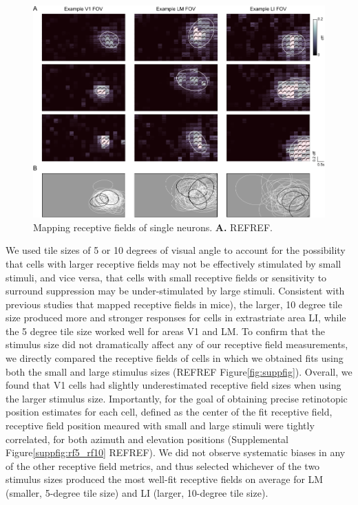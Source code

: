 \begin{figure}[t!]
    \includegraphics[width=\textwidth]{figures/chapter_3/fig_3-2_rf_examples/fig_3-2_rf_examples.pdf}
    \vspace{.1in}
    \caption[Receptive field mapping]{Mapping receptive fields of single neurons. \textbf{A.} REFREF.
    \label{fig:rf_examples}}
\end{figure}

We used tile sizes of 5 or 10 degrees of visual angle to account for the possibility that cells with larger receptive fields may not be effectively stimulated by small stimuli, and vice versa, that cells with small receptive fields or sensitivity to surround suppression may be under-stimulated by large stimuli. Consistent with previous studies that mapped receptive fields in mice\cite{DeVries2019}), the larger, 10 degree tile size produced more and stronger responses for cells in extrastriate area LI, while the 5 degree tile size worked well for areas V1 and LM. To confirm that the stimulus size did not dramatically affect any of our receptive field measurements, we directly compared the receptive fields of cells in which we obtained fits using both the small and large stimulus sizes (REFREF Figure\ref{fig:suppfig}). Overall, we found that V1 cells had slightly underestimated receptive field sizes when using the larger stimulus size. Importantly, for the goal of obtaining precise retinotopic position estimates for each cell, defined as the center of the fit receptive field, receptive field position meaured with small and large stimuli were tightly correlated, for both azimuth and elevation positions (Supplemental Figure\ref{suppfig:rf5_rf10} REFREF). We did not observe systematic biases in any of the other receptive field metrics, and thus selected whichever of the two stimulus sizes produced the most well-fit receptive fields on average for LM (smaller, 5-degree tile size) and LI (larger, 10-degree tile size). 

